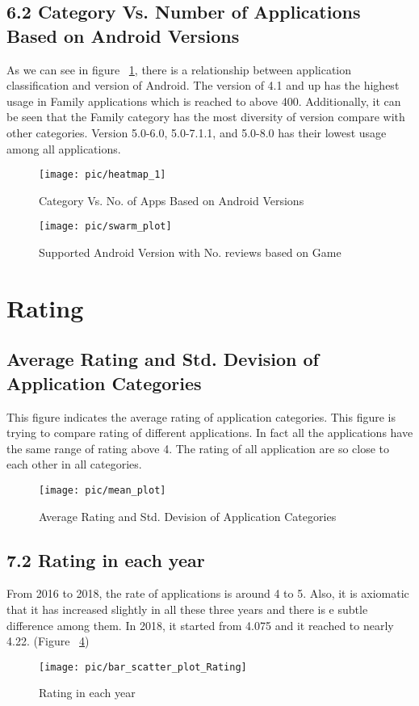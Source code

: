 \subsection*{6.2 Category Vs. Number of Applications Based on Android Versions}
As we can see in figure ~\ref{fig:12}, there is a relationship between application classification and version of Android. The version of 4.1 and up has the highest usage in Family applications which is reached to above 400. Additionally, it can be seen that the Family category has the most diversity of version compare with other categories. Version 5.0-6.0, 5.0-7.1.1, and 5.0-8.0 has their lowest usage among all applications.
\begin{figure}
\centering
\texttt{[image: pic/heatmap\_1]}
\caption{Category Vs. No. of Apps Based on Android Versions} 
\label{fig:12}
\end{figure}

\begin{figure}
\centering
\texttt{[image: pic/swarm\_plot]}
\caption{Supported Android Version with No. reviews based on Game}
\label{fig:5}
\end{figure}

\section*{Rating}
\subsection*{Average Rating and Std. Devision of Application Categories}
This figure indicates the average rating of application categories. This figure is trying to compare rating of different applications. In fact all the applications have the same range of rating above 4. The rating of all application are so close to each other in all categories.
\begin{figure}
\centering
\texttt{[image: pic/mean\_plot]}
\caption{Average Rating and Std. Devision of Application Categories} 
\label{fig:6}
\end{figure}

\subsection*{7.2 Rating in each year}
From 2016 to 2018, the rate of applications is around 4 to 5. Also, it is axiomatic that it has increased slightly in all these three years and there is e subtle difference among them. In 2018, it started from 4.075 and it reached to nearly 4.22. (Figure ~\ref{fig:7})
\begin{figure}
\centering
\texttt{[image: pic/bar\_scatter\_plot\_Rating]}
\caption{Rating in each year} 
\label{fig:7}
\end{figure}

